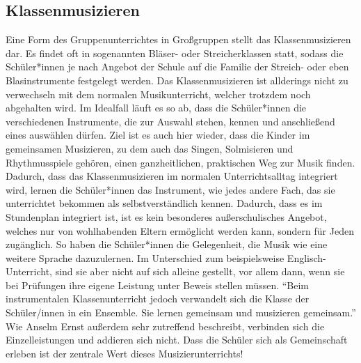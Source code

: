 \subsection{Klassenmusizieren}
Eine Form des Gruppenunterrichtes in Großgruppen stellt das Klassenmusizieren
dar. Es findet oft in sogenannten Bläser- oder Streicherklassen statt, sodass
die Schüler*innen je nach Angebot der Schule auf die Familie der Streich- oder
eben Blasinstrumente festgelegt werden. Das Klassenmusizieren ist allderings
nicht zu verwechseln mit dem normalen Musikunterricht, welcher trotzdem noch
abgehalten wird. Im Idealfall läuft es so ab, dass die Schüler*innen die
verschiedenen Instrumente, die zur Auswahl stehen, kennen und anschließend eines
auswählen dürfen. Ziel ist es auch hier wieder, dass die Kinder im gemeinsamen
Musizieren, zu dem auch das Singen, Solmisieren und Rhythmusspiele gehören,
einen ganzheitlichen, praktischen Weg zur Musik finden.
\autocite[91]{ernst:die_zukunftsfaehige_musikschule} Dadurch, dass das
Klassenmusizieren im normalen Unterrichtsalltag integriert wird, lernen die
Schüler*innen das Instrument, wie jedes andere Fach, das sie unterrichtet
bekommen als selbstverständlich kennen. Dadurch, dass es im Stundenplan
integriert ist, ist es kein besonderes außerschulisches Angebot, welches nur von
wohlhabenden Eltern ermöglicht werden kann, sondern für Jeden zugänglich. So
haben die Schüler*innen die Gelegenheit, die Musik wie eine weitere Sprache
dazuzulernen. Im Unterschied zum beispielsweise Englisch-Unterricht, sind sie
aber nicht auf sich alleine gestellt, vor allem dann, wenn sie bei Prüfungen
ihre eigene Leistung unter Beweis stellen müssen. \enquote{Beim instrumentalen
Klassenunterricht jedoch verwandelt sich die Klasse der Schüler/innen in ein
Ensemble. Sie lernen gemeinsam und musizieren gemeinsam.}
\autocite[92]{ernst:die_zukunftsfaehige_musikschule} Wie Anselm Ernst außerdem
sehr zutreffend beschreibt, verbinden sich die Einzelleistungen und addieren
sich nicht. Dass die Schüler sich als Gemeinschaft erleben ist der zentrale Wert
dieses Musizierunterrichts!









